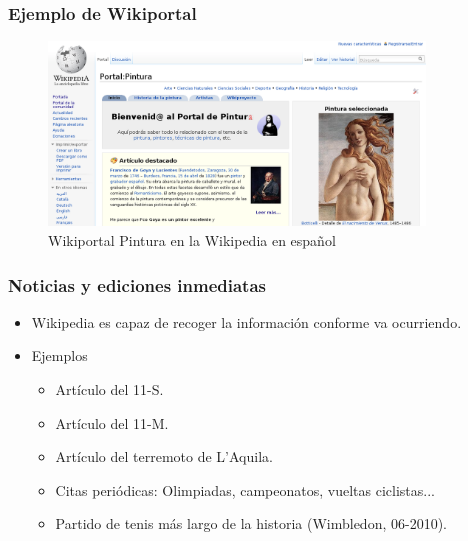 \begin{frame}
\frametitle{Ejemplo de Wikiportal}

\begin{figure}[htp]
\centering
\includegraphics[width=10cm]{figs/wikiportal-pintura.png}
\caption{Wikiportal Pintura en la Wikipedia en español}
\end{figure}

\end{frame}


\begin{frame}
\frametitle{Noticias y ediciones inmediatas}

    \begin{itemize}
      \item Wikipedia es capaz de recoger la información conforme va ocurriendo.

      \item Ejemplos

      \begin{itemize}
    \item Artículo del 11-S.
    \item Artículo del 11-M.
    \item Artículo del terremoto de L'Aquila.
    \item Citas periódicas: Olimpiadas, campeonatos, vueltas ciclistas...
     \item Partido de tenis más largo de la historia (Wimbledon, 06-2010).
      \end{itemize}

    \end{itemize}

\end{frame}


